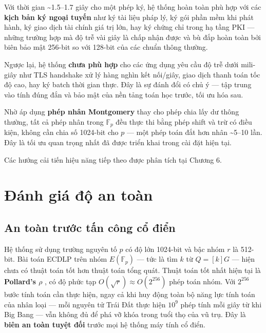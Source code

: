 Với thời gian \textasciitilde1.5--1.7 giây cho một phép ký, hệ thống
hoàn toàn phù hợp với các \textbf{kịch bản ký ngoại tuyến} như ký tài
liệu pháp lý, ký gói phần mềm khi phát hành, ký giao dịch tài chính giá
trị lớn, hay ký chứng chỉ trong hạ tầng PKI --- những trường hợp mà độ
trễ vài giây là chấp nhận được và bù đắp hoàn toàn bởi biên bảo mật
256-bit so với 128-bit của các chuẩn thông thường.

Ngược lại, hệ thống \textbf{chưa phù hợp} cho các ứng dụng yêu cầu độ
trễ dưới mili-giây như TLS handshake xử lý hàng nghìn kết nối/giây, giao
dịch thanh toán tốc độ cao, hay ký batch thời gian thực. Đây là sự đánh
đổi có chủ ý --- tập trung vào tính đúng đắn và bảo mật của nền tảng
toán học trước, tối ưu hóa sau.

Nhờ áp dụng \textbf{phép nhân Montgomery} thay cho phép chia lấy dư
thông thường, tất cả phép nhân trong \(\mathbb{F}_p\) đều thực thi bằng
phép shift và trừ có điều kiện, không cần chia số 1024-bit cho \(p\) ---
một phép toán đắt hơn nhân \textasciitilde5--10 lần. Đây là tối ưu quan
trọng nhất đã được triển khai trong cài đặt hiện tại.

Các hướng cải tiến hiệu năng tiếp theo được phân tích tại Chương 6.

\section{Đánh giá độ an
toàn}\label{ux111uxe1nh-giuxe1-ux111ux1ed9-an-touxe0n}

\subsection{An toàn trước tấn công cổ
điển}\label{an-touxe0n-trux1b0ux1edbc-tux1ea5n-cuxf4ng-cux1ed5-ux111iux1ec3n}

Hệ thống sử dụng trường nguyên tố \(p\) có độ lớn 1024-bit và bậc nhóm
\(r\) là 512-bit. Bài toán ECDLP trên nhóm \(E(\mathbb{F}_p)\) --- tức
là tìm \(k\) từ \(Q = [k]G\) --- hiện chưa có thuật toán tốt hơn thuật
toán tổng quát. Thuật toán tốt nhất hiện tại là \textbf{Pollard's
\(\rho\)} \citep{PollardRho1978}, có độ phức tạp
\(O(\sqrt{r}) \approx O(2^{256})\) phép toán nhóm. Với \(2^{256}\) bước
tính toán cần thực hiện, ngay cả khi huy động toàn bộ năng lực tính toán
của nhân loại --- mỗi nguyên tử Trái Đất thực hiện \(10^9\) phép tính
mỗi giây từ khi Big Bang --- vẫn không đủ để phá vỡ khóa trong tuổi thọ
của vũ trụ. Đây là \textbf{biên an toàn tuyệt đối} trước mọi hệ thống
máy tính cổ điển.

